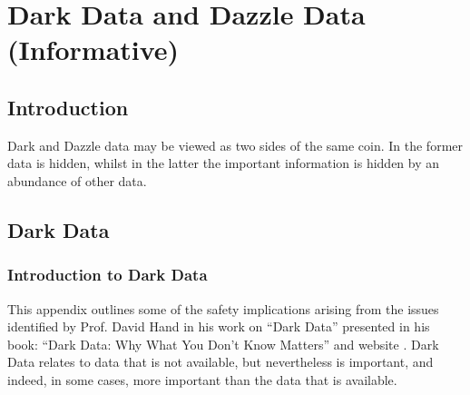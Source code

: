 %
%
\section{Dark Data and Dazzle Data (Informative)}%
\label{bkm:darkdazzledata}
%

\subsection{Introduction}
Dark and Dazzle data may be viewed as two sides of the same coin. In the former data is hidden, whilst in the latter the important information is hidden by an abundance of other data.

\subsection{Dark Data}%
%
\label{bkm:darkdata}
%
\subsubsection{Introduction to Dark Data}
This appendix outlines some of the safety implications arising from the issues identified by Prof. David Hand in his work on ``Dark Data'' presented in his book: ``Dark Data: Why What You Don't Know Matters'' \cite{citation:darkdata:hand} and website \cite{citation:darkdata:website}. Dark Data relates to data that is not available, but nevertheless is important, and indeed, in some cases, more important than the data that is available.

